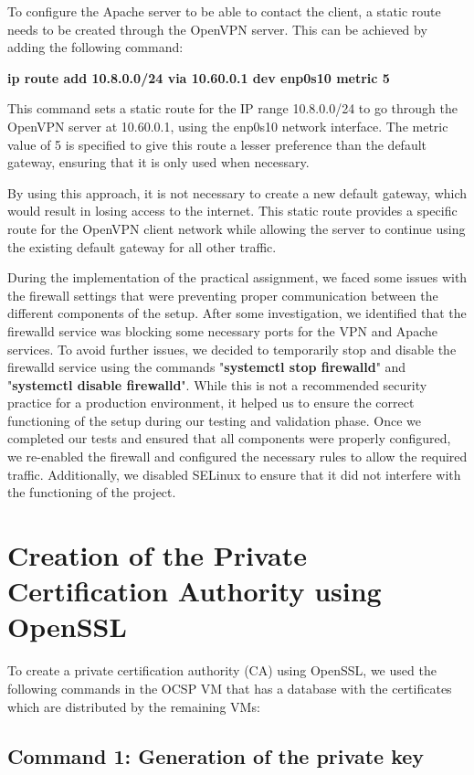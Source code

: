 \documentclass[12pt]{article}
\begin{document}
To configure the Apache server to be able to contact the client, a static route needs to be created through the OpenVPN server. This can be achieved by adding the following command:


\textbf{ip route add 10.8.0.0/24 via 10.60.0.1 dev enp0s10 metric 5}

This command sets a static route for the IP range 10.8.0.0/24 to go through the OpenVPN server at 10.60.0.1, using the enp0s10 network interface. The metric value of 5 is specified to give this route a lesser preference than the default gateway, ensuring that it is only used when necessary.

By using this approach, it is not necessary to create a new default gateway, which would result in losing access to the internet. This static route provides a specific route for the OpenVPN client network while allowing the server to continue using the existing default gateway for all other traffic.

\newpage

During the implementation of the practical assignment, we faced some issues with the firewall settings that were preventing proper communication between the different components of the setup. After some investigation, we identified that the firewalld service was blocking some necessary ports for the VPN and Apache services. To avoid further issues, we decided to temporarily stop and disable the firewalld service using the commands "\textbf{systemctl stop firewalld}" and "\textbf{systemctl disable firewalld}". While this is not a recommended security practice for a production environment, it helped us to ensure the correct functioning of the setup during our testing and validation phase. Once we completed our tests and ensured that all components were properly configured, we re-enabled the firewall and configured the necessary rules to allow the required traffic.
Additionally, we disabled SELinux to ensure that it did not interfere with the functioning of the project.


\section{Creation of the Private Certification Authority using OpenSSL}

To create a private certification authority (CA) using OpenSSL, we used the following commands in the OCSP VM that has a database with the certificates which are distributed by the remaining VMs:

\subsection{Command 1: Generation of the private key}
\end{document}
